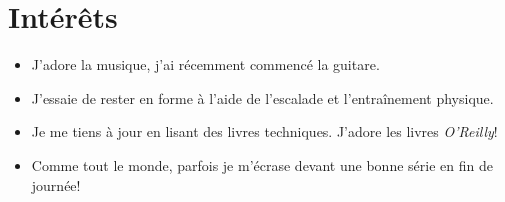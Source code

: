 \documentclass[french]{article}
\begin{document}
	\section{Intérêts}
	\begin{itemize}
		\item J'adore la musique, j'ai récemment commencé la guitare.
		\item J'essaie de rester en forme à l'aide de l'escalade et l'entraînement physique.
		\item Je me tiens à jour en lisant des livres techniques. J'adore les livres \textit{O'Reilly}!
		\item Comme tout le monde, parfois je m'écrase devant une bonne série en fin de journée!
	\end{itemize}
\end{document}
